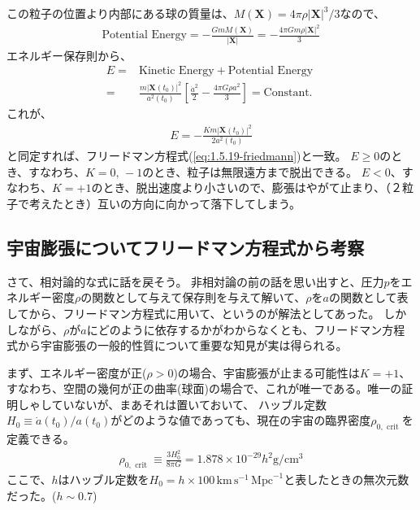 \documentclass[11pt]{ltjsarticle}
\theoremstyle{plain}
\theoremstyle{break}
\begin{document}
この粒子の位置より内部にある球の質量は、$M(\mathbf{X})=4 \pi \rho|\mathbf{X}|^{3} / 3$なので、
\begin{align}
  \mathrm{Potential \,\,Energy}=-\frac{G m M(\mathbf{X})}{|\mathbf{X}|}=-\frac{4 \pi G m \rho|\mathbf{X}|^{2}}{3}
\end{align}%
エネルギー保存則から、
\begin{align}
  E
  	=& \mathrm{Kinetic\,\,Energy} +\mathrm{Potential \,\,Energy} \\
	=&\frac{m\left|\mathbf{X}\left(t_{0}\right)\right|^{2}}{a^{2}\left(t_{0}\right)}\left[\frac{\dot{a}^{2}}{2}-\frac{4 \pi G \rho a^{2}}{3}\right]
	=\text {Constant. }
\end{align}%
これが、
\begin{align}
  E=-\frac{K m\left|\mathbf{X}\left(t_{0}\right)\right|^{2}}{2 a^{2}\left(t_{0}\right)}
\end{align}%
と同定すれば、フリードマン方程式(\eqref{eq:1.5.19-friedmann})と一致。
$E \geq 0$のとき、すなわち、$K = 0 , \,-1$のとき、粒子は無限遠方まで脱出できる。
$E < 0 $、すなわち、$K = +1 $のとき、脱出速度より小さいので、膨張はやがて止まり、（２粒子で考えたとき）互いの方向に向かって落下してしまう。

\subsection{宇宙膨張についてフリードマン方程式から考察}
さて、相対論的な式に話を戻そう。
非相対論の前の話を思い出すと、圧力$p$をエネルギー密度$\rho$の関数として与えて保存則を与えて解いて、$\rho$を$a$の関数として表してから、フリードマン方程式に用いて、というのが解法としてあった。
しかしながら、$\rho$が$a$にどのように依存するかがわからなくとも、フリードマン方程式から宇宙膨張の一般的性質について重要な知見が実は得られる。

まず、エネルギー密度が正($\rho > 0$)の場合、宇宙膨張が止まる可能性は$K = +1$、すなわち、空間の幾何が正の曲率(球面)の場合で、これが唯一である。唯一の証明しゃしていないが、まあそれは置いておいて、
ハッブル定数$H_{0} \equiv \dot{a}\left(t_{0}\right) / a\left(t_{0}\right)$がどのような値であっても、現在の宇宙の臨界密度$\rho_{0, \text { crit }} $を定義できる。
\begin{align}
  \rho_{0, \text { crit }} \equiv \frac{3 H_{0}^{2}}{8 \pi G}=1.878 \times 10^{-29} h^{2} \mathrm{g} / \mathrm{cm}^{3}
\end{align}%
ここで、$h$はハッブル定数を$H_{0}=h \times 100 \, \mathrm{km} \, \mathrm{s}^{-1} \,\mathrm{Mpc}^{-1}$と表したときの無次元数だった。($h \sim 0.7$)
\end{document}
